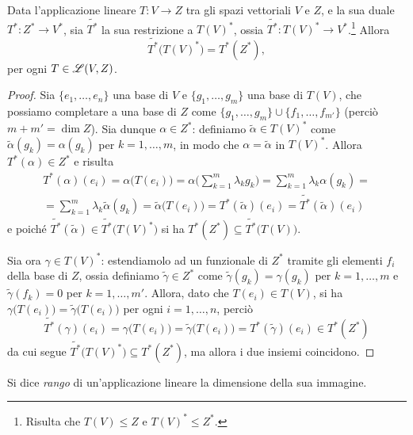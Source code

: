 \begin{teorema} \label{t:rango-mappa-duale}
	Data l'applicazione lineare $T\colon V\to Z$ tra gli spazi vettoriali $V$ e $Z$, e la sua duale $T^*\colon Z^*\to V^*$, sia $\tilde{T^*}$ la sua restrizione a $T(V)^*$, ossia $\tilde{T^*}\colon T(V)^*\to V^*$.\footnote{
		Risulta che $T(V)\le Z$ e $T(V)^*\le Z^*$.
	}
	Allora
	\begin{equation}
		\tilde{T^*}\big(T(V)^*\big)=T^*(Z^*),
	\end{equation}
	per ogni $T\in\mathscr L(V,Z)$.
\end{teorema}
\begin{proof}
	Sia $\{e_1,\dots,e_n\}$ una base di $V$ e $\{g_1,\dots,g_m\}$ una base di $T(V)$, che possiamo completare a una base di $Z$ come $\{g_1,\dots,g_m\}\cup\{f_1,\dots,f_{m'}\}$ (perciò $m+m'=\dim Z$).
	Sia dunque $\alpha\in Z^*$: definiamo $\tilde{\alpha}\in T(V)^*$ come $\tilde{\alpha}(g_k)=\alpha(g_k)$ per $k=1,\dots,m$, in modo che $\alpha=\tilde{\alpha}$ in $T(V)^*$.
	Allora $T^*(\alpha)\in Z^*$ e risulta
	\begin{multline}
		T^*(\alpha)(e_i)=\alpha\big(T(e_i)\big)=\alpha\bigg(\sum_{k=1}^m\lambda_kg_k\bigg)=\sum_{k=1}^m\lambda_k\alpha(g_k)=\\=
		\sum_{k=1}^m\lambda_k\tilde{\alpha}(g_k)=\tilde{\alpha}\big(T(e_i)\big)=T^*(\tilde{\alpha})(e_i)=\tilde{T^*}(\tilde{\alpha})(e_i)
	\end{multline}
	e poich\'e $\tilde{T^*}(\tilde{\alpha})\in\tilde{T^*}\big(T(V)^*\big)$ si ha $T^*(Z^*)\subseteq \tilde{T^*}\big(T(V)\big)$.

	Sia ora $\gamma\in T(V)^*$: estendiamolo ad un funzionale di $Z^*$ tramite gli elementi $f_i$ della base di $Z$, ossia definiamo $\tilde{\gamma}\in Z^*$ come $\tilde{\gamma}(g_k)=\gamma(g_k)$ per $k=1,\dots,m$ e $\tilde{\gamma}(f_k)=0$ per $k=1,\dots,m'$.
	Allora, dato che $T(e_i)\in T(V)$, si ha $\gamma\big(T(e_i)\big)=\tilde{\gamma}\big(T(e_i)\big)$ per ogni $i=1,\dots,n$, perciò
	\begin{equation}
		\tilde{T^*}(\gamma)(e_i)=\gamma\big(T(e_i)\big)=\tilde{\gamma}\big(T(e_i)\big)=T^*(\tilde{\gamma})(e_i)\in T^*(Z^*)
	\end{equation}
	da cui segue $\tilde{T^*}\big(T(V)^*\big)\subseteq T^*(Z^*)$, ma allora i due insiemi coincidono.
\end{proof}
\begin{definizione} \label{d:rango-applicazione-lineare}
	Si dice \emph{rango} di un'applicazione lineare la dimensione della sua immagine.
\end{definizione}
